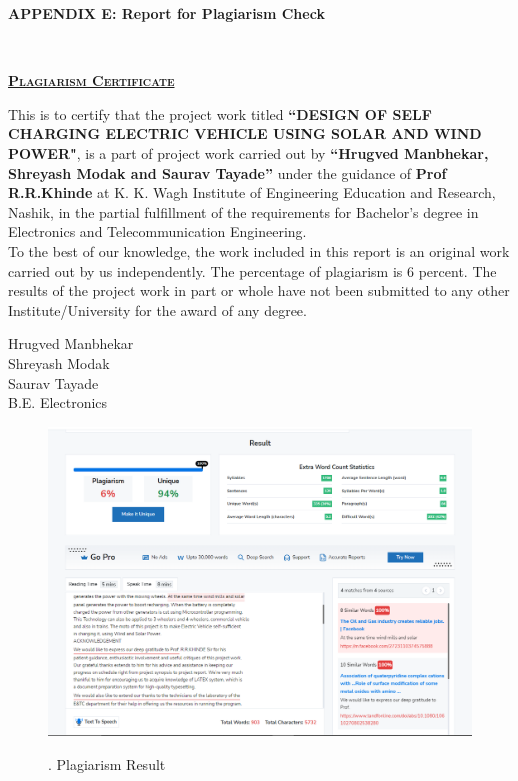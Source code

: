 \documentclass[a4paper,12pt]{article}
\begin{document}
\newpage
\begin{center}
\LARGE\textbf{APPENDIX E: Report for Plagiarism Check}
\\[1cm]
\end{center}
\thispagestyle{empty}
\begin{center}
\textbf{\LARGE\scshape\underline{Plagiarism Certificate}}\\[2cm]
\end{center}
\large This is to certify that the project work titled \textbf{“DESIGN OF SELF CHARGING ELECTRIC VEHICLE USING SOLAR AND WIND POWER"}, is a part of project work carried out by \textbf{“Hrugved Manbhekar, Shreyash Modak and Saurav Tayade”}
under the guidance of\textbf{ Prof R.R.Khinde} at K. K. Wagh Institute of
Engineering Education and Research, Nashik, in the partial fulfillment of the requirements
for Bachelor’s degree in Electronics and Telecommunication Engineering.\\
\large To the best of our knowledge, the work included in this report is an original work
carried out by us independently. The percentage of plagiarism is 6 percent. The results of the
project work in part or whole have not been submitted to any other Institute/University for
the award of any degree.

\vspace{4cm}
\begin{flushright}
Hrugved Manbhekar\\
Shreyash Modak\\
Saurav Tayade\\

B.E. Electronics\\
\end{flushright}

\newpage
\begin{figure}[!h]
\centering
\includegraphics[scale=0.5]{pl.png}\\
\caption{. Plagiarism Result}
\end{figure}
\end{document}
